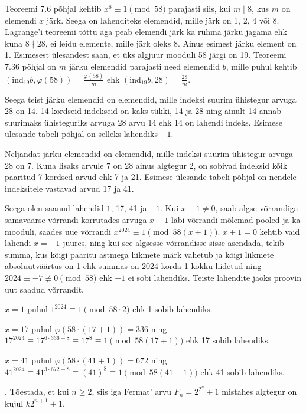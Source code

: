 \documentclass[a4paper, 10pt]{article}
\begin{document}
Teoreemi 7.6 põhjal kehtib $x^8\equiv1\pmod{58}$ parajasti siis, kui $m\mid 8$, kus $m$ on elemendi $x$ järk. Seega on lahenditeks elemendid, mille järk on 1, 2, 4 või 8. Lagrange'i teoreemi tõttu aga peab elemendi järk ka rühma järku jagama ehk kuna $8\nmid28$, ei leidu elemente, mille järk oleks 8. Ainus esimest järku element on 1. Esimesest ülesandest saan, et üks algjuur mooduli 58 järgi on 19. Teoreemi 7.36 põhjal on $m$ järku elemendid parajasti need elemendid $b$, mille puhul kehtib $(\text{ind}_{19}b,\varphi(58))=\frac{\varphi(58)}{m}$ ehk $(\text{ind}_{19}b,28)=\frac{28}{m}$.

Seega teist järku elemendid on elemendid, mille indeksi suurim ühistegur arvuga 28 on 14. 14 kordseid indekseid on kaks tükki, 14 ja 28 ning ainult 14 annab suurimaks ühisteguriks arvuga 28 arvu 14 ehk 14 on lahendi indeks. Esimese ülesande tabeli põhjal on selleks lahendiks $-1$.

Neljandat järku elemendid on elemendid, mille indeksi suurim ühistegur arvuga 28 on 7. Kuna lisaks arvule 7 on 28 ainus algtegur 2, on sobivad indeksid kõik paaritud 7 kordsed arvud ehk 7 ja 21. Esimese ülesande tabeli põhjal on nendele indeksitele vastavad arvud 17 ja 41.

Seega olen saanud lahendid $1$, 17, 41 ja $-1$. Kui $x+1\not=0$, saab algse võrrandiga samaväärse võrrandi korrutades arvuga $x+1$ läbi võrrandi mõlemad pooled ja ka mooduli, saades uue võrrandi $x^{2024}\equiv1\pmod{58(x+1)}$. $x+1=0$ kehtib vaid lahendi $x=-1$ juures, ning kui see algsesse võrrandisse sisse asendada, tekib summa, kus kõigi paaritu astmega liikmete märk vahetub ja kõigi liikmete absoluutväärtus on 1 ehk summas on 2024 korda 1 kokku liidetud ning $2024\equiv-7\not\equiv0\pmod{58}$ ehk $-1$ ei sobi lahendiks. Teiste lahendite jaoks proovin uut saadud võrrandit.

$x=1$ puhul $1^{2024}\equiv1\pmod{58\cdot2}$ ehk 1 sobib lahendiks.

$x=17$ puhul $\varphi(58\cdot(17+1))=336$ ning $17^{2024}\equiv17^{6\cdot336+8}\equiv17^8\equiv1\pmod{58(17+1)}$ ehk 17 sobib lahendiks.

$x=41$ puhul $\varphi(58\cdot(41+1))=672$ ning $41^{2024}\equiv41^{3\cdot672+8}\equiv(41)^8\equiv1\pmod{58(41+1)}$ ehk 41 sobib lahendiks.
\bigskip

. Tõestada, et kui $n\geq 2$, siis iga Fermat' arvu $F_n = 2^{2^n}+1$ mistahes algtegur on kujul $k2^{n+1}+1$. 
\end{document}
